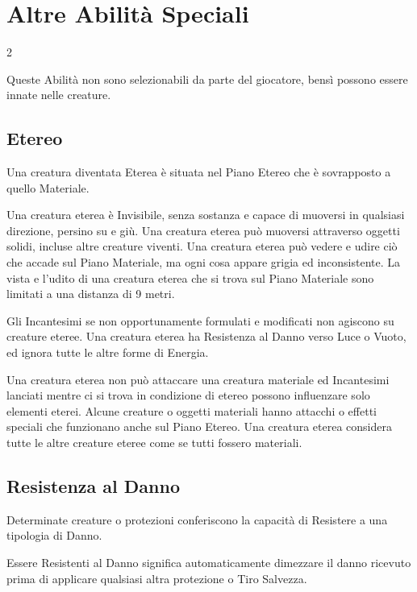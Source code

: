 \section{Altre Abilità Speciali}

\begin{multicols}{2}

Queste Abilità non sono selezionabili da parte del giocatore, bensì possono essere innate nelle creature.

\subsection{Etereo}\label{etereo}

Una creatura diventata Eterea è situata nel Piano Etereo che è sovrapposto a quello Materiale.

Una creatura eterea è Invisibile, senza sostanza e capace di muoversi in qualsiasi direzione, persino su e giù. Una creatura eterea può muoversi attraverso oggetti solidi, incluse altre creature viventi. Una creatura eterea può vedere e udire ciò che accade sul Piano Materiale, ma ogni cosa appare grigia ed inconsistente. La vista e l'udito di una creatura eterea che si trova sul Piano Materiale sono limitati a una distanza di 9 metri.

Gli Incantesimi se non opportunamente formulati e modificati non agiscono su creature eteree. Una creatura eterea ha Resistenza al Danno verso Luce o Vuoto, ed ignora tutte le altre forme di Energia.

Una creatura eterea non può attaccare una creatura materiale ed Incantesimi lanciati mentre ci si trova in condizione di etereo possono influenzare solo elementi eterei. Alcune creature o oggetti materiali hanno attacchi o effetti speciali che funzionano anche sul Piano Etereo. Una creatura eterea considera tutte le altre creature eteree come se tutti fossero materiali.

\subsection{Resistenza al Danno}\label{resistenzaaldanno}

Determinate creature o protezioni conferiscono la capacità di Resistere a una tipologia di Danno.

Essere Resistenti al Danno significa automaticamente dimezzare il danno ricevuto prima di applicare qualsiasi altra protezione o Tiro Salvezza.


\end{multicols}
